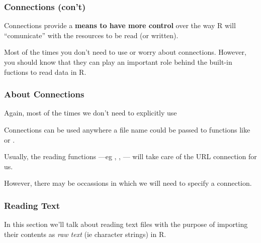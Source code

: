 \documentclass[12pt]{beamer}\usepackage[]{graphicx}\usepackage[]{color}
\begin{document}
\begin{frame}
\frametitle{Connections (con't)}

Connections provide a \textbf{means to have more control} over the way R will ``comunicate'' with the resources to be read (or written).
\eb

Most of the times you don't need to use or worry about connections. However, you should know that they can play an important role behind the built-in fuctions to read data in R.
\eb

\end{frame}


\begin{frame}
\frametitle{About Connections}

 \bi
  \item Again, most of the times we don't need to explicitly use {\hilit {}}
  \item Connections can be used anywhere a file name could be passed to functions like  or . 
  \item Usually, the reading functions ---eg , , --- will take care of the URL connection for us.
  \item However, there may be occassions in which we will need to specify a  connection.
 \ei
\eb

\end{frame}


\begin{frame}
\begin{center}
\Huge{}
\end{center}
\end{frame}


\begin{frame}
\frametitle{Reading Text}

In this section we'll talk about reading text files with the purpose of importing their contents as \textit{raw text} (ie character strings) in R.
\eb

\end{frame}

\end{document}
